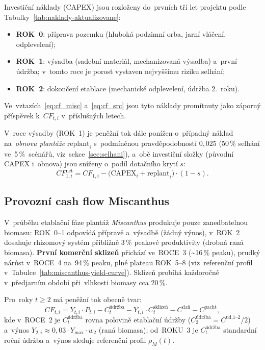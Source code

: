 Investiční náklady (CAPEX) jsou rozloženy do~prvních tří let projektu
podle Tabulky~\ref{tab:naklady-aktualizovane}:
\begin{itemize}
    \item \textbf{ROK~0}: příprava pozemku (hluboká podzimní orba,
          jarní vláčení, odplevelení);
    \item \textbf{ROK~1}: výsadba (sadební materiál, mechanizovaná
          výsadba) a~první údržba; v~tomto roce je porost vystaven
          nejvyššímu riziku selhání;
    \item \textbf{ROK~2}: dokončení etablace (mechanické odplevelení,
          údržba 2.~roku).
\end{itemize}
Ve~vztazích~\eqref{eq:cf_misc} a~\eqref{eq:cf_src} jsou tyto náklady
promítnuty jako záporný příspěvek k~$CF_{t,i}$ v~příslušných letech.

V~roce výsadby (ROK~1) je peněžní tok dále ponížen o~případný náklad
na~\emph{obnovu plantáže} $\text{replant}_i$ s~podmíněnou pravděpodobností
$0{,}025$ (50\,\% selhání ve~5\,\%~scénářů, viz~sekce~\ref{sec:selhani}),
a~obě investiční složky (původní CAPEX i~obnova) jsou sníženy o~podíl
dotačního krytí $s$:
\begin{equation}
    CF_{1,i}^{\text{net}} = CF_{1,i} -
        \bigl(\text{CAPEX}_i + \text{replant}_i\bigr) \cdot (1-s).
    \label{eq:cf_year1_subsidy}
\end{equation}

\subsection{Provozní cash flow Miscanthus}
\label{subsec:cf_misc}

V~průběhu etablační fáze plantáž \textit{Miscanthus} produkuje pouze
zanedbatelnou biomasu: ROK~0--1 odpovídá přípravě a~výsadbě (žádný
výnos), v~ROK~2 dosahuje rhizomový systém přibližně 3\,\% peakové
produktivity (drobná raná biomasa). \textbf{První komerční sklizeň}
přichází ve~ROCE~3 (\textasciitilde 16\,\% peaku), prudký nárůst
v~ROCE~4 na~94\,\% peaku, plné plateau ROK~5--8 (viz~referenční
profil v~Tabulce~\ref{tab:miscanthus-yield-curve}). Sklizeň probíhá
každoročně v~předjarním období při~vlhkosti biomasy cca 20\,\%.

Pro~roky $t \geq 2$ má peněžní tok obecně tvar:
\begin{equation}
    CF_{t,i} = Y_{t,i} \cdot P_{t,i} - C_t^{\text{údržba}}
                - Y_{t,i} \cdot C_t^{\text{sklizeň}}
                - C^{\text{daň}} - C^{\text{pacht}},
    \label{eq:cf_misc}
\end{equation}
kde v~ROCE~2 je $C_t^{\text{údržba}}$ rovna polovině etablační údržby
($C^{\text{údržba}}_2 = C^{\text{ud,1--2}}/2$) a~výnos $Y_{2,i}
\approx 0{,}03 \cdot Y_{\max} \cdot w_2$ (raná biomasa); od~ROKU~3
je $C_t^{\text{údržba}}$ standardní roční údržba a~výnos sleduje
referenční profil $\rho_M(t)$.

